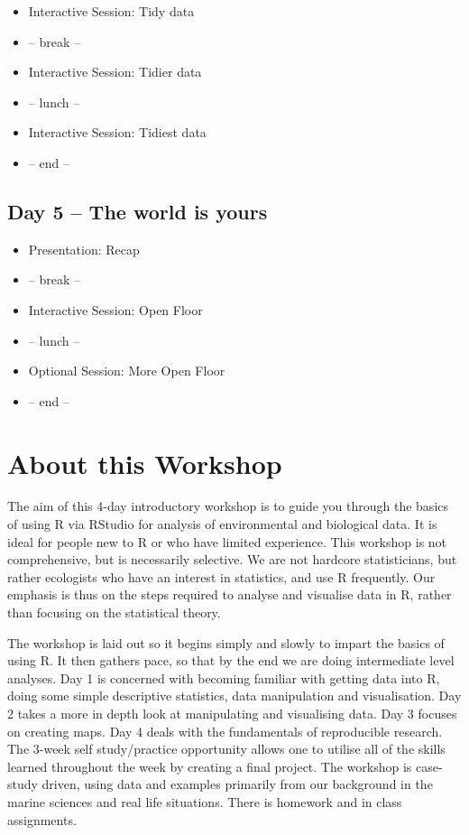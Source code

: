 \documentclass[
]{book}
\providecommand{\tightlist}{%
  \setlength{\itemsep}{0pt}\setlength{\parskip}{0pt}}
\begin{document}
\begin{itemize}
\tightlist
\item
  Interactive Session: Tidy data
\item
  -- break --
\item
  Interactive Session: Tidier data
\item
  -- lunch --
\item
  Interactive Session: Tidiest data
\item
  -- end --
\end{itemize}

\hypertarget{day-5-the-world-is-yours}{%
\subsection*{Day 5 -- The world is yours}\label{day-5-the-world-is-yours}}

\begin{itemize}
\tightlist
\item
  Presentation: Recap
\item
  -- break --
\item
  Interactive Session: Open Floor
\item
  -- lunch --
\item
  Optional Session: More Open Floor
\item
  -- end --
\end{itemize}

\hypertarget{about-this-workshop}{%
\section{About this Workshop}\label{about-this-workshop}}

The aim of this 4-day introductory workshop is to guide you through the basics of using R via RStudio for analysis of environmental and biological data. It is ideal for people new to R or who have limited experience. This workshop is not comprehensive, but is necessarily selective. We are not hardcore statisticians, but rather ecologists who have an interest in statistics, and use R frequently. Our emphasis is thus on the steps required to analyse and visualise data in R, rather than focusing on the statistical theory.

The workshop is laid out so it begins simply and slowly to impart the basics of using R. It then gathers pace, so that by the end we are doing intermediate level analyses. Day 1 is concerned with becoming familiar with getting data into R, doing some simple descriptive statistics, data manipulation and visualisation. Day 2 takes a more in depth look at manipulating and visualising data. Day 3 focuses on creating maps. Day 4 deals with the fundamentals of reproducible research. The 3-week self study/practice opportunity allows one to utilise all of the skills learned throughout the week by creating a final project. The workshop is case-study driven, using data and examples primarily from our background in the marine sciences and real life situations. There is homework and in class assignments.
\end{document}
